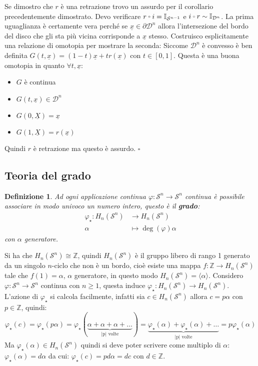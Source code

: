 \documentclass[10pt, twoside=false, x11names]{scrbook}
\newtheorem{definition}[theorem]{Definizione}
\newenvironment{proof}{{\textbf{Dimostrazione}:}}{\hfill $\square$}
\newcommand{\Z}{\mathbb{Z}}
\newcommand{\Id}[1][]{\mathbb{I}_#1}
\newcommand{\Sph}[1][]{\mathcal{S}^#1}
\newcommand{\Disk}[1][]{\mathcal{D}^#1}
\renewcommand{\vec}[1]{\underline{#1}}
\let\latexcirc=\circ
\newcommand{\ccirc}{\mathbin{\mathchoice
  {\xcirc\scriptstyle}
  {\xcirc\scriptstyle}
  {\xcirc\scriptscriptstyle}
  {\xcirc\scriptscriptstyle}
}}
\newcommand{\xcirc}[1]{\vcenter{\hbox{$#1\latexcirc$}}}
\let\circ\ccirc
\let\phi\varphi
\begin{document}
\begin{proof}
  Se dimostro che $ r $ è una retrazione trovo un assurdo per il corollario
  precedentemente dimostrato.
  Devo verificare $ r \circ i = \Id{\Sph{n-1}} $ e $ i \circ r \sim \Id{\Disk{n}} $.
  La prima uguaglianza è certamente vera perché se $ \vec{x} \in \partial \Disk{n} $
  allora l'intersezione del bordo del disco che gli sta più vicina corrisponde a
  $ \vec{x} $ stesso.
  Costruisco esplicitamente una relazione di omotopia per mostrare la seconda:
  Siccome $ \Disk{n} $ è convesso è ben definita $ G(t, \vec{x}) = (1-t)\vec{x}
  + t r(\vec{x}) $ con $ t \in [0,1] $. Questa è una buona omotopia in quanto $ \forall t, \vec{x} $:
  \begin{itemize}
  \item $ G $ è continua
  \item $ G(t, \vec{x}) \in \Disk{n} $
  \item $ G(0, \vec{X}) = \vec{x} $
  \item $ G(1, \vec{X}) = r(\vec{x}) $
  \end{itemize}
  Quindi $ r $ è retrazione ma questo è assurdo.
\end{proof}


\subsection{Teoria del grado}
\begin{definition}
  Ad ogni applicazione continua $ \phi \colon \Sph{n} \to \Sph{n} $ continua è possibile
  associare in modo univoco un numero intero, questo è il \textbf{grado}:
  \begin{align*}
    \phi_\star \colon H_n(\Sph{n}) & \to H_n(\Sph{n}) \\
    \alpha & \mapsto  \deg{(\phi)} \alpha
  \end{align*}
  con $ \alpha $ generatore.
\end{definition}

Si ha che $ H_n(\Sph{n}) \cong \Z $, quindi $ H_n(\Sph{n}) $ è il gruppo
libero di rango 1 generato da un singolo $ n $-ciclo che non è un bordo,
cioè esiste una mappa $ f \colon \Z \to H_n(\Sph{n}) $ tale che $ f(1) = \alpha $,
$ \alpha $ generatore, in questo modo $ H_n(\Sph{n}) = \langle\alpha\rangle $.
Considero $ \phi \colon \Sph{n} \to \Sph{n} $ continua con $ n \geq 1 $, questa induce
$ \phi_\star \colon H_n(\Sph{n}) \to H_n(\Sph{n}) $.
L'azione di $ \phi_\star $ si calcola facilmente, infatti sia $ c \in H_n(\Sph{n}) $
allora $ c = p \alpha $ con $ p \in \Z $, quindi:
\[
  \phi_\star (c) = \phi_\star (p \alpha) = \phi_\star (\underbrace{\alpha + \alpha + \alpha + \dots}_{\text{|p| volte}}) =
  \underbrace{\phi_\star (\alpha) + \phi_\star (\alpha) + \dots}_{\text{|p| volte}} = p \phi_\star(\alpha)
\]
Ma $ \phi_\star(\alpha) \in H_n(\Sph{n}) $ quindi si deve poter scrivere come multiplo di $ \alpha $:
$ \phi_\star (\alpha) = d \alpha $ da cui: $ \phi_\star (c) = p d \alpha = d c $ con $ d \in \Z $.
\end{document}
